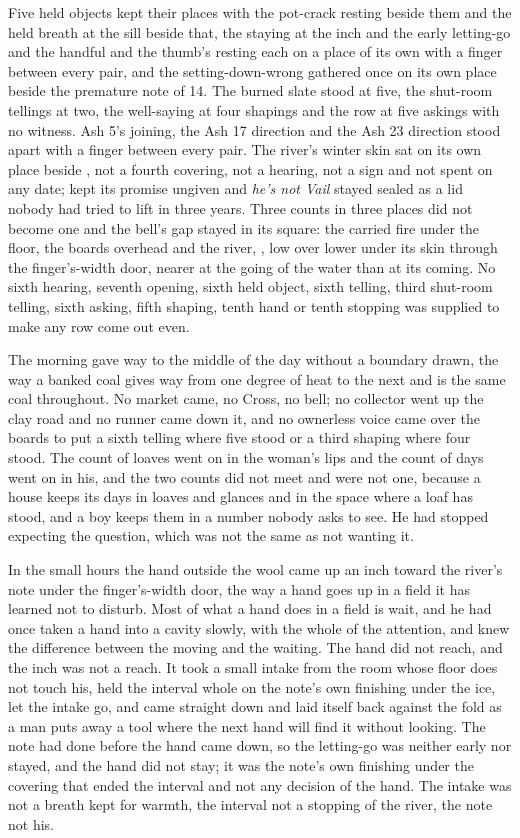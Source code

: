 Five held objects kept their places with the pot-crack resting beside them and the held breath at the sill beside that, the staying at the inch and the early letting-go and the handful and the thumb's resting each on a place of its own with a finger between every pair, and the setting-down-wrong gathered once on its own place beside the premature note of  14. The burned slate stood at five, the shut-room tellings at two, the well-saying at four shapings and the row at five askings with no witness. Ash 5's joining, the Ash 17 direction and the Ash 23 direction stood apart with a finger between every pair. The river's winter skin sat on its own place beside , not a fourth covering, not a hearing, not a sign and not spent on any date;  kept its promise ungiven and \emph{he's not Vail} stayed sealed as a lid nobody had tried to lift in three years. Three counts in three places did not become one and the bell's gap stayed in its square: the carried fire under the floor, the boards overhead and the river, , low over lower under its skin through the finger's-width door, nearer at the going of the water than at its coming. No sixth hearing, seventh opening, sixth held object, sixth telling, third shut-room telling, sixth asking, fifth shaping, tenth hand or tenth stopping was supplied to make any row come out even.

The morning gave way to the middle of the day without a boundary drawn, the way a banked coal gives way from one degree of heat to the next and is the same coal throughout. No market came, no Cross, no bell; no collector went up the clay road and no runner came down it, and no ownerless voice came over the boards to put a sixth telling where five stood or a third shaping where four stood. The count of loaves went on in the woman's lips and the count of days went on in his, and the two counts did not meet and were not one, because a house keeps its days in loaves and glances and in the space where a loaf has stood, and a boy keeps them in a number nobody asks to see. He had stopped expecting the question, which was not the same as not wanting it.

In the small hours the hand outside the wool came up an inch toward the river's note under the finger's-width door, the way a hand goes up in a field it has learned not to disturb. Most of what a hand does in a field is wait, and he had once taken a hand into a cavity slowly, with the whole of the attention, and knew the difference between the moving and the waiting. The hand did not reach, and the inch was not a reach. It took a small intake from the room whose floor does not touch his, held the interval whole on the note's own finishing under the ice, let the intake go, and came straight down and laid itself back against the fold as a man puts away a tool where the next hand will find it without looking. The note had done before the hand came down, so the letting-go was neither early nor stayed, and the hand did not stay; it was the note's own finishing under the covering that ended the interval and not any decision of the hand. The intake was not a breath kept for warmth, the interval not a stopping of the river, the note not his.

